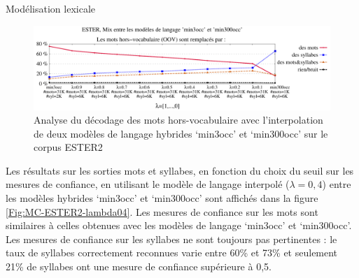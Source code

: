 \documentclass{style/these}
\begin{document}
\begin{part}{Modélisation lexicale}
\begin{figure}[h!]
\centering
\includegraphics[scale=0.52]{images/results/ESTER_OOV_mixedLMs-3-300.pdf}
\caption{Analyse du décodage des mots hors-vocabulaire avec l'interpolation de deux modèles de langage hybrides `min3occ' et `min300occ' sur le corpus ESTER2}
\label{Fig:OOV-ESTER-iLM}
\end{figure}


 
Les résultats sur les sorties mots et syllabes, en fonction du choix du seuil sur les mesures de confiance, en utilisant le modèle de langage interpolé ($\lambda=0,4$) entre les modèles hybrides `min3occ' et `min300occ' sont affichés dans la figure \ref{Fig:MC-ESTER2-lambda04}. 
Les mesures de confiance sur les mots sont similaires à celles obtenues avec les modèles de langage `min3occ' et `min300occ'. 
Les mesures de confiance sur les syllabes ne sont toujours pas pertinentes : le taux de syllabes correctement reconnues varie entre 60\% et 73\% et seulement 21\% de syllabes ont une mesure de confiance supérieure à 0,5.




\end{part}
\end{document}
